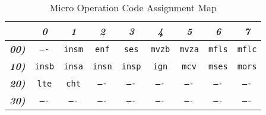 \begin{table}[H]
\begin{center}
\caption {Micro Operation Code Assignment Map}
\label{t4.9}
\begin{tabular}{|c|c|c|c|c|c|c|c|c|}
\hline
 & \textit{\textbf{0}} & \textit{\textbf{1}} & \textit{\textbf{2}} & \textit{\textbf{3}} & \textit{\textbf{4}} & \textit{\textbf{5}} & \textit{\textbf{6}} & \textit{\textbf{7}}\\
\hline
\textit{\textbf{00)}} &
\texttt{----} &
\texttt{insm} &
\texttt{enf} &
\texttt{ses} &
\texttt{mvzb} &
\texttt{mvza} &
\texttt{mfls} &
\texttt{mflc} \\

\textit{\textbf{10)}} &
\texttt{insb} &
\texttt{insa} &
\texttt{insn} &
\texttt{insp} &
\texttt{ign} &
\texttt{mcv} &
\texttt{mses} &
\texttt{mors} \\

\textit{\textbf{20)}} &
\texttt{lte} &
\texttt{cht} &
\texttt{----} &
\texttt{----} &
\texttt{----} &
\texttt{----} &
\texttt{----} &
\texttt{----} \\

\textit{\textbf{30)}} &
\texttt{----} &
\texttt{----} &
\texttt{----} &
\texttt{----} &
\texttt{----} &
\texttt{----} &
\texttt{----} &
\texttt{----} \\

\hline
\end{tabular}
\end{center}
\end{table}

